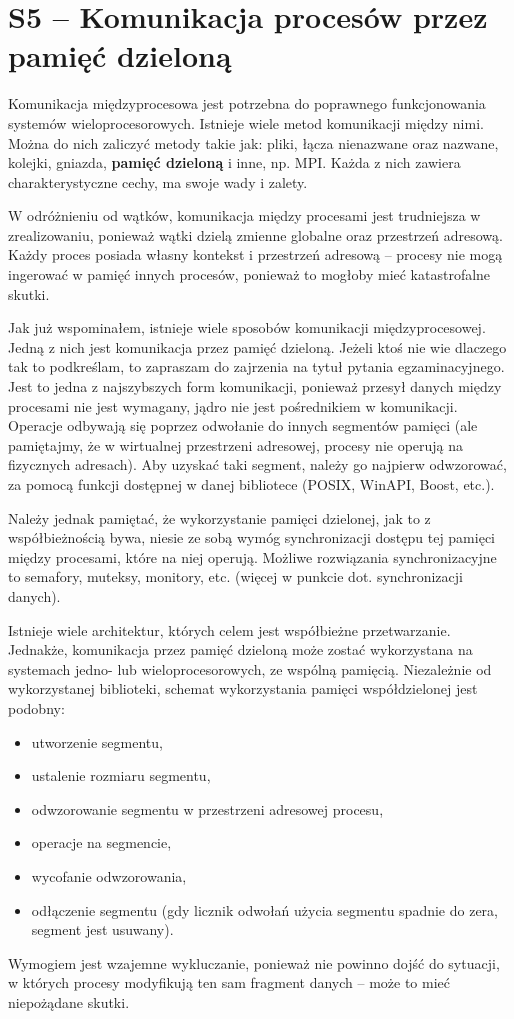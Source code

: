 \section{S5 -- Komunikacja procesów przez pamięć dzieloną}

Komunikacja międzyprocesowa jest potrzebna do poprawnego funkcjonowania systemów wieloprocesorowych. Istnieje wiele metod komunikacji między nimi. Można do nich zaliczyć metody takie jak: pliki, łącza nienazwane oraz nazwane, kolejki, gniazda, \textbf{pamięć dzieloną} i inne, np. MPI. Każda z nich zawiera charakterystyczne cechy, ma swoje wady i zalety. 

W odróżnieniu od wątków, komunikacja między procesami jest trudniejsza w zrealizowaniu, ponieważ wątki dzielą zmienne globalne oraz przestrzeń adresową. Każdy proces posiada własny kontekst i przestrzeń adresową -- procesy nie mogą ingerować w pamięć innych procesów, ponieważ to mogłoby mieć katastrofalne skutki.

Jak już wspominałem, istnieje wiele sposobów komunikacji międzyprocesowej. Jedną z nich jest komunikacja przez pamięć dzieloną. Jeżeli ktoś nie wie dlaczego tak to podkreślam, to zapraszam do zajrzenia na tytuł pytania egzaminacyjnego. Jest to jedna z najszybszych form komunikacji, ponieważ przesył danych między procesami nie jest wymagany, jądro nie jest pośrednikiem w komunikacji. Operacje odbywają się poprzez odwołanie do innych segmentów pamięci (ale pamiętajmy, że w wirtualnej przestrzeni adresowej, procesy nie operują na fizycznych adresach). Aby uzyskać taki segment, należy go najpierw odwzorować, za pomocą funkcji dostępnej w danej bibliotece (POSIX, WinAPI, Boost, etc.).

Należy jednak pamiętać, że wykorzystanie pamięci dzielonej, jak to z współbieżnością bywa, niesie ze sobą wymóg synchronizacji dostępu tej pamięci między procesami, które na niej operują. Możliwe rozwiązania synchronizacyjne to semafory, muteksy, monitory, etc. (więcej w punkcie dot. synchronizacji danych).

Istnieje wiele architektur, których celem jest współbieżne przetwarzanie. Jednakże, komunikacja przez pamięć dzieloną może zostać wykorzystana na systemach jedno- lub wieloprocesorowych, ze wspólną pamięcią. Niezależnie od wykorzystanej biblioteki, schemat wykorzystania pamięci współdzielonej jest podobny:
\begin{itemize}
\item utworzenie segmentu,
\item ustalenie rozmiaru segmentu,
\item odwzorowanie segmentu w przestrzeni adresowej procesu,
\item operacje na segmencie,
\item wycofanie odwzorowania,
\item odłączenie segmentu (gdy licznik odwołań użycia segmentu spadnie do zera, segment jest usuwany).
\end{itemize}
Wymogiem jest wzajemne wykluczanie, ponieważ nie powinno dojść do sytuacji, w których procesy modyfikują ten sam fragment danych -- może to mieć niepożądane skutki.

